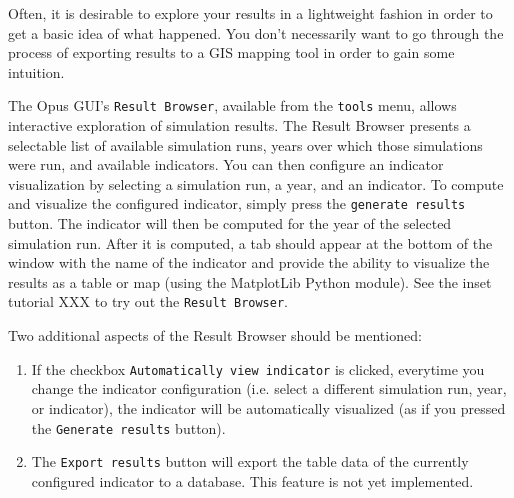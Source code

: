 Often, it is desirable to explore your results in a lightweight
fashion in order to get a basic idea of what happened. You don't
necessarily want to go through the process of exporting results to a
GIS mapping tool in order to gain some intuition. 

The Opus GUI's \verb#Result Browser#, available from the \verb#tools#
menu, allows interactive exploration of simulation results. The Result
Browser presents a selectable list of available simulation runs, years
over which those simulations were run, and available indicators. You
can then configure an indicator visualization by selecting a simulation
run, a year, and an indicator. To compute and visualize the configured
indicator, simply press the \verb#generate results# button. The
indicator will then be computed for the year of the selected simulation
run. After it is computed, a tab should appear at the bottom of the
window with the name of the indicator and provide the ability to
visualize the results as a table or map (using the MatplotLib Python
module). See the inset tutorial XXX to try out the \verb#Result Browser#.


Two additional aspects of the Result Browser should be mentioned:
\begin{enumerate}
  \item If the checkbox \verb#Automatically view indicator# is
  clicked, everytime you change the indicator configuration (i.e.
  select a different simulation run, year, or indicator), the
  indicator will be automatically visualized (as if you pressed the
  \verb#Generate results# button). 
  \item The \verb#Export results# button will export the table data
  of the currently configured indicator to a database. This feature
  is not yet implemented. 
\end{enumerate}


